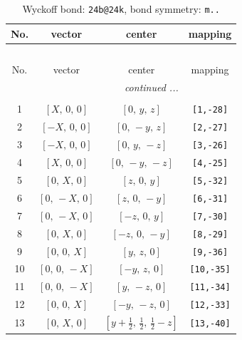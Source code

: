 \documentclass[fleqn,8pt]{jsarticle}
\begin{document}
\begin{longtable}{cccc}
\caption{Wyckoff bond: {\tt 24b@24k}, bond symmetry: {\tt m..}}
 \\
 \hline \hline
No. & vector & center & mapping \\ \hline \endfirsthead

\multicolumn{3}{l}{\tablename\ \thetable{}} \\
 \hline \hline
No. & vector & center & mapping \\ \hline \endhead

 \hline \hline
\multicolumn{3}{r}{\footnotesize\it continued ...} \\ \endfoot

 \hline \hline
\multicolumn{3}{r}{} \\ \endlastfoot

1 & $\left[ X,\, 0,\, 0 \right]$ & $\left[ 0,\, y,\, z \right]$ & {\tt [1,-28]} \\ \hline
2 & $\left[ - X,\, 0,\, 0 \right]$ & $\left[ 0,\, - y,\, z \right]$ & {\tt [2,-27]} \\ \hline
3 & $\left[ - X,\, 0,\, 0 \right]$ & $\left[ 0,\, y,\, - z \right]$ & {\tt [3,-26]} \\ \hline
4 & $\left[ X,\, 0,\, 0 \right]$ & $\left[ 0,\, - y,\, - z \right]$ & {\tt [4,-25]} \\ \hline
5 & $\left[ 0,\, X,\, 0 \right]$ & $\left[ z,\, 0,\, y \right]$ & {\tt [5,-32]} \\ \hline
6 & $\left[ 0,\, - X,\, 0 \right]$ & $\left[ z,\, 0,\, - y \right]$ & {\tt [6,-31]} \\ \hline
7 & $\left[ 0,\, - X,\, 0 \right]$ & $\left[ - z,\, 0,\, y \right]$ & {\tt [7,-30]} \\ \hline
8 & $\left[ 0,\, X,\, 0 \right]$ & $\left[ - z,\, 0,\, - y \right]$ & {\tt [8,-29]} \\ \hline
9 & $\left[ 0,\, 0,\, X \right]$ & $\left[ y,\, z,\, 0 \right]$ & {\tt [9,-36]} \\ \hline
10 & $\left[ 0,\, 0,\, - X \right]$ & $\left[ - y,\, z,\, 0 \right]$ & {\tt [10,-35]} \\ \hline
11 & $\left[ 0,\, 0,\, - X \right]$ & $\left[ y,\, - z,\, 0 \right]$ & {\tt [11,-34]} \\ \hline
12 & $\left[ 0,\, 0,\, X \right]$ & $\left[ - y,\, - z,\, 0 \right]$ & {\tt [12,-33]} \\ \hline
13 & $\left[ 0,\, X,\, 0 \right]$ & $\left[ y + \frac{1}{2},\, \frac{1}{2},\, \frac{1}{2} - z \right]$ & {\tt [13,-40]} \\ \hline

\end{longtable}
\end{document}
